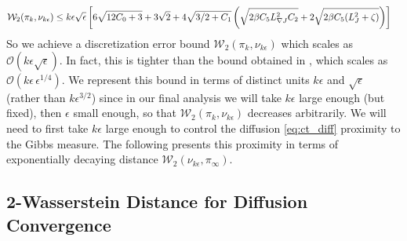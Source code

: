 \documentclass[journal,onecolumn]{IEEEtran}
\newcommand{\step}{\epsilon}
\newcommand{\grad}{\nabla}
\newcommand{\rew}{J}
\newcommand{\dimn}{N}
\newcommand{\kn}{\kappa_0}
\newcommand{\wass}{\mathcal{W}_2}
\newcommand{\gibbs}{\ids_{\infty}}
\newcommand{\dtlaw}{\ids_{k}} %
\newcommand{\ctlaw}{\nu_{k\step}}
\newcommand{\ids}{\pi}
\newcommand{\idw}{\gamma}
\newcommand{\ksp}{k,\idw}
\newcommand{\idiffcc}{I'}
\newcommand{\dissb}{b}
\newcommand{\gradnvar}{\zeta}
\newcommand{\lipJ}{L_J}
\newcommand{\lipGJ}{L_{\grad\rew}}
\begin{document}
{
\begin{align}
\begin{split}
\label{eq:wassdt}
\wass(\dtlaw,\ctlaw) %
&\leq {\color{black} k\step\sqrt{\step}\left[6\sqrt{12C_0 + 3} + 3\sqrt{2} + 4\sqrt{3/2 + C_1}\left(\sqrt{2\beta C_5 \lipGJ^2 C_2} + 2\sqrt{2\beta C_5(\lipJ^2 + \gradnvar)} \right)\right]}
\end{split}
\end{align}
So we achieve a discretization error bound $\wass(\dtlaw,\ctlaw)$ which scales as $\mathcal{O}(k\step\sqrt{\step})$. In fact, this is tighter than the bound obtained in \cite{raginsky2017non}, which scales as $\mathcal{O}(k\step\,\step^{1/4})$. We represent this bound in terms of distinct units $k\step$ and $\sqrt{\step}$ (rather than $k\step^{3/2}$) since in our final analysis we will take $k\step$ large enough (but fixed), then $\step$ small enough, so that $\wass(\dtlaw,\ctlaw)$ decreases arbitrarily. We will need to first take $k\step$ large enough to control the diffusion \eqref{eq:ct_diff} proximity to the Gibbs measure. The following presents this proximity in terms of exponentially decaying distance $\wass(\ctlaw,\gibbs)$.


\subsection{2-Wasserstein Distance for Diffusion Convergence}
\label{sec:DC}

}
\end{document}
